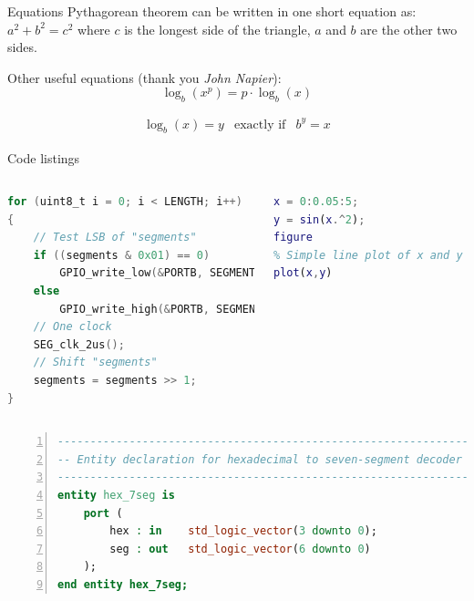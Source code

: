 \documentclass[aspectratio=1610]{beamer}
\begin{document}
\begin{frame}{Equations}
    Pythagorean theorem can be written in one short equation as: $a^2 + b^2 = c^2$ where $c$ is the longest side of the triangle, $a$ and $b$ are the other two sides.

    \vfill %

    Other useful equations (thank you \textit{John Napier}):
    \begin{equation}
        \log_b (x^p) = p\cdot \log_b (x)
    \end{equation}

    \begin{eqnarray*}
        \log_b(x) = y & \text{exactly if} & b^y = x
    \end{eqnarray*}
\end{frame}


\begin{frame}[fragile]{Code listings}

    \vspace*{-.5cm}
    \begin{columns}
\begin{lstlisting}[language=C,title={C example}]
for (uint8_t i = 0; i < LENGTH; i++)
{
    // Test LSB of "segments"
    if ((segments & 0x01) == 0)
        GPIO_write_low(&PORTB, SEGMENT_DATA);
    else
        GPIO_write_high(&PORTB, SEGMENT_DATA);
    // One clock
    SEG_clk_2us();
    // Shift "segments"
    segments = segments >> 1;
}
\end{lstlisting}

\begin{lstlisting}[language=Matlab,caption={Matlab example}]
x = 0:0.05:5;
y = sin(x.^2);
figure
% Simple line plot of x and y values
plot(x,y)
\end{lstlisting}
    \end{columns}

\begin{lstlisting}[language=vhdl,title={VHDL example},numbers=left]
---------------------------------------------------------------
-- Entity declaration for hexadecimal to seven-segment decoder
---------------------------------------------------------------
entity hex_7seg is
    port (
        hex : in    std_logic_vector(3 downto 0);
        seg : out   std_logic_vector(6 downto 0)
    );
end entity hex_7seg;
\end{lstlisting}
\end{frame}
\end{document}
